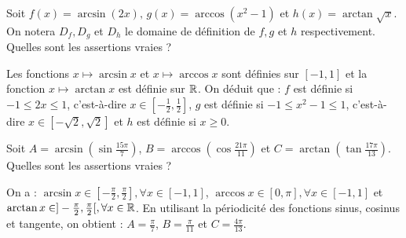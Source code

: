 \begin{question} 
Soit $f(x)= \arcsin (2x), \, g(x)= \arccos (x^2-1) $ et $h(x)= \arctan \sqrt{x}$. On notera $D_f,D_g$ et $D_h$  le domaine de définition de $f, g$ et $h$ respectivement. Quelles sont les assertions vraies ?
\begin{answers}


    
    \good{$D_h=[0,+\infty[$}

    
\end{answers}
\begin{explanations}
Les fonctions $x\mapsto \arcsin x$ et  $x \mapsto \arccos x$ sont définies sur $[-1,1]$ et la fonction  $x \mapsto  \arctan x$ est définie sur $\mathbb{R}$. On déduit que :
$f$ est définie si $-1\le 2x\le 1$, c'est-à-dire $x \in [-\frac{1}{2}, \frac{1}{2}]$, 
$g$ est définie si $-1 \le x^2-1 \le 1$, c'est-à-dire $x\in [-\sqrt 2, \sqrt 2]$ et  $h$ est définie si $x\ge 0$.
\end{explanations}

\end{question}


\begin{question} 
Soit $A=\arcsin (\sin \frac{15\pi}{7})$, $B=\arccos (\cos \frac{21\pi}{11})$ et $C=\arctan (\tan \frac{17\pi}{13})$.  Quelles sont les assertions vraies ?

\begin{answers}



\end{answers}
\begin{explanations}
On a : $\arcsin x \in [-\frac{\pi}{2},\frac{\pi}{2}], \forall x \in [-1,1]$,   $\arccos x \in [0,\pi], \forall x\in [-1,1]$ et $\arctan x \in ]-\frac{\pi}{2},\frac{\pi}{2}[, \forall x \in \mathbb{R}$. En utilisant la périodicité des fonctions sinus, cosinus et tangente, on obtient : $A=\frac{\pi}{7}$, $B=\frac{\pi}{11}$ et $C=\frac{ 4\pi}{13}$.
\end{explanations}


\end{question}





